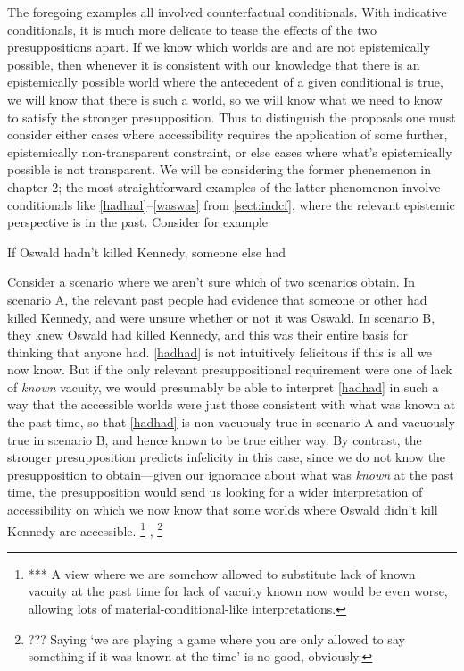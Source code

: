 \documentclass[If.tex]{subfiles}
\begin{document}
The foregoing examples all involved counterfactual conditionals. With indicative conditionals, it is much more delicate to tease the effects of the two presuppositions apart. If we know which worlds are and are not epistemically possible, then whenever it is consistent with our knowledge that there is an epistemically possible world where the antecedent of a given conditional is true, we will know that there is such a world, so we will know what we need to know to satisfy the stronger presupposition. Thus to distinguish the proposals one must consider either cases where accessibility requires the application of some further, epistemically non-transparent constraint, or else cases where what's epistemically possible is not transparent. We will be considering the former phenemenon in chapter 2; the most straightforward examples of the latter phenomenon involve conditionals like \ref{hadhad}--\ref{waswas} from \autoref{sect:indcf}, where the relevant epistemic perspective is in the past. Consider for example
\begin{prop}
	\sitem[\ref{hadhad}] If Oswald hadn't killed Kennedy, someone else had 
\end{prop}
Consider a scenario where we aren't sure which of two scenarios obtain. In scenario A, the relevant past people had evidence that someone or other had killed Kennedy, and were unsure whether or not it was Oswald. In scenario B, they knew Oswald had killed Kennedy, and this was their entire basis for thinking that anyone had. \ref{hadhad} is not intuitively felicitous if this is all we now know. But if the only relevant presuppositional requirement were one of lack of \emph{known} vacuity, we would presumably be able to interpret \ref{hadhad} in such a way that the accessible worlds were just those consistent with what was known at the past time, so that \ref{hadhad} is non-vacuously true in scenario A and vacuously true in scenario B, and hence known to be true either way. By contrast, the stronger presupposition predicts infelicity in this case, since we do not know the presupposition to obtain---given our ignorance about what was \emph{known} at the past time, the presupposition would send us looking for a wider interpretation of accessibility on which we now know that some worlds where Oswald didn't kill Kennedy are accessible.%
\footnote{*** A view where we are somehow allowed to substitute lack of known vacuity at the past time for lack of vacuity known now would be even worse, allowing lots of material-conditional-like interpretations.}
,%
\footnote{??? Saying ‘we are playing a game where you are only allowed to say something if it was known at the time’ is no good, obviously.}
\end{document}
